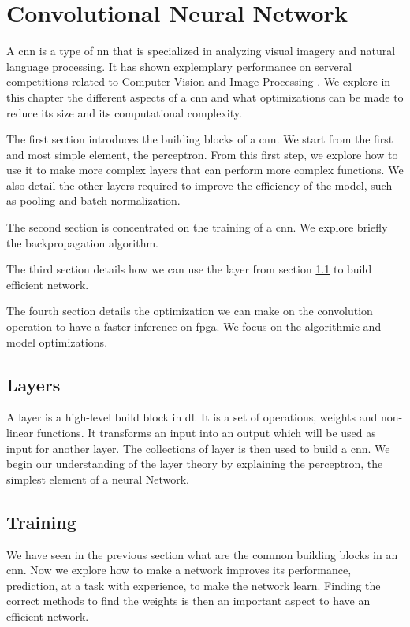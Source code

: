 \chapter{Convolutional Neural Network} \label{chap:cnn}
A \acrfull{cnn} is a type of \acrlong{nn} that is specialized in analyzing visual imagery and natural language processing. It has shown explemplary performance on serveral competitions related to Computer Vision and Image Processing \cite{khan_survey_2020}. We explore in this chapter the different aspects of a \acrshort{cnn} and what optimizations can be made to reduce its size and its computational complexity.

The first section introduces the building blocks of a \acrshort{cnn}. We start from the first and most simple element, the perceptron. From this first step, we explore how to use it to make more complex layers that can perform more complex functions. We also detail the other layers required to improve the efficiency of the model, such as pooling and batch-normalization.

The second section is concentrated on the training of a \acrshort{cnn}. We explore briefly the backpropagation algorithm.

The third section details how we can use the layer from section \ref{sec:layer} to build efficient network.

The fourth section details the optimization we can make on the convolution operation to have a faster inference on \acrshort{fpga}. We focus on the algorithmic and model optimizations.
%
%
\section{Layers} \label{sec:layer}
A layer is a high-level build block in \acrshort{dl}. It is a set of operations, weights and non-linear functions. It transforms an input into an output which will be used as input for another layer. The collections of layer is then used to build a \acrlong{cnn}. We begin our understanding of the layer theory by explaining the perceptron, the simplest element of a neural Network.
%
%

%

%

%

%

%

%
%
\section{Training} \label{sec:train}
We have seen in the previous section what are the common building blocks in an \acrshort{cnn}. Now we explore how to make a network improves its performance, prediction, at a task with experience, to make the network learn. Finding the correct methods to find the weights is then an important aspect to have an efficient network.

